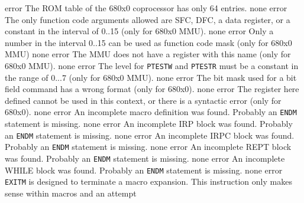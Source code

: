 \documentclass[12pt,twoside]{report}
\newcommand{\tty}[1]{{\tt #1}}
\begin{document}
\begin{description}
               {error}
               {The ROM table of the 680x0 coprocessor has only 64 entries.}
               {none}
               {error}
               {The only function code arguments allowed are SFC, DFC, a
                data register, or a constant in the interval of 0..15 (only
                for 680x0 MMU).}
               {none}
               {error}
               {Only a number in the interval 0..15 can be used as
                function code mask (only for 680x0 MMU)}
               {none}
               {error}
               {The MMU does not have a register with this name (only for
                680x0 MMU).}
               {none}
               {error}
               {The level for \tty{PTESTW} and \tty{PTESTR} must be a constant in the
                range of 0...7 (only for 680x0 MMU).}
               {none}
               {error}
               {The bit mask used for a bit field command has a wrong
                format (only for 680x0).}
               {none}
               {error}
               {The register here defined cannot be used in this context,
                or there is a syntactic error (only for 680x0).}
               {none}
               {error}
               {An incomplete macro definition was found. Probably an
                \tty{ENDM} statement is missing.}
               {none}
               {error}
               {An incomplete IRP block was found. Probably an
                \tty{ENDM} statement is missing.}
               {none}
               {error}
               {An incomplete IRPC block was found. Probably an
                \tty{ENDM} statement is missing.}
               {none}
               {error}
               {An incomplete REPT block was found. Probably an
                \tty{ENDM} statement is missing.}
               {none}
               {error}
               {An incomplete WHILE block was found. Probably an
                \tty{ENDM} statement is missing.}
               {none}
               {error}
               {\tty{EXITM} is designed to terminate a macro expansion.  This
                instruction only makes sense within macros and an attempt
}
\end{description}
\end{document}

